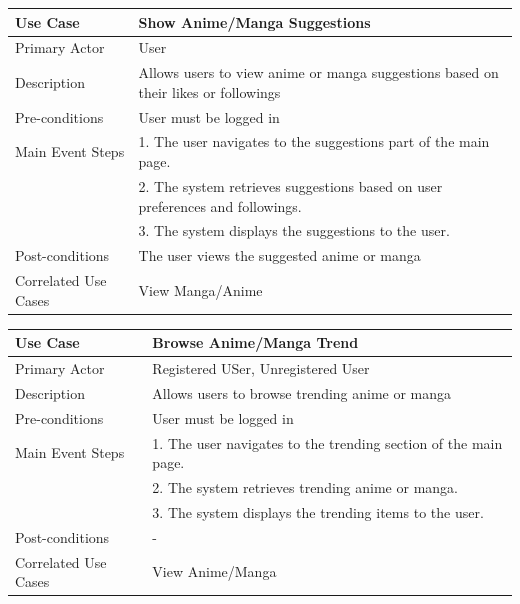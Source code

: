 \begin{longtable}{|p{}|p{}|}
    \hline
    \rowcolor{lightblue}
    \textbf{Use Case} & \textbf{Show Anime/Manga Suggestions} \\
    \hline
    Primary Actor &User \\
    \hline
    Description & Allows users to view anime or manga suggestions based on their likes or followings\\
    \hline
    Pre-conditions & User must be logged in\\
    \hline
    Main Event Steps & 1. The user navigates to the suggestions part of the main page. \\
    & 2. The system retrieves suggestions based on user preferences and followings. \\
    & 3. The system displays the suggestions to the user. \\
    \hline
    Post-conditions & The user views the suggested anime or manga\\
    \hline
    Correlated Use Cases & View Manga/Anime\\
    \hline
\end{longtable}

\newpage

\begin{longtable}{|p{}|p{}|}
    \hline
    \rowcolor{lightblue}
    \textbf{Use Case} & \textbf{Browse Anime/Manga Trend} \\
    \hline
    Primary Actor & Registered USer, Unregistered User\\
    \hline
    Description &Allows users to browse trending anime or manga\\
    \hline
    Pre-conditions & User must be logged in\\
    \hline
    Main Event Steps & 1. The user navigates to the trending section of the main page. \\
    & 2. The system retrieves trending anime or manga. \\
    & 3. The system displays the trending items to the user. \\
    \hline
    Post-conditions &-\\
    \hline
    Correlated Use Cases &View Anime/Manga \\
    \hline
\end{longtable}



